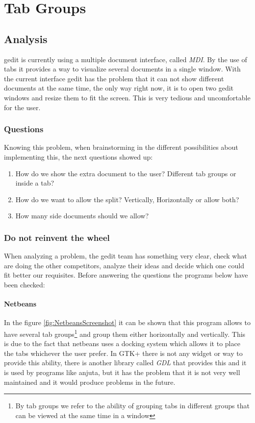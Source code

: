 
\chapter{Tab Groups}

\section{Analysis}

gedit is currently using a multiple document interface, called \emph{MDI}. By the use of tabs it provides a way to visualize several documents in a single window. With the current interface gedit has the problem that it can not show different documents at the same time, the only way right now, it is to open two gedit windows and resize them to fit the screen. This is very tedious and uncomfortable for the user.

\subsection{Questions}

Knowing this problem, when brainstorming in the different possibilities about implementing this, the next questions showed up:
\begin{enumerate}
  \item How do we show the extra document to the user? Different tab groups or inside a tab?
  \item How do we want to allow the split? Vertically, Horizontally or allow both?
  \item How many side documents should we allow?
\end{enumerate}

\subsection{Do not reinvent the wheel}

When analyzing a problem, the gedit team has something very clear, check what are doing the other competitors, analyze their ideas and decide which one could fit better our requisites. Before answering the questions the programs below have been checked:

\subsubsection{Netbeans}

In the figure \ref{fig:NetbeansScreenshot} it can be shown that this program allows to have several tab groups\footnote{By tab groups we refer to the ability of grouping tabs in different groups that can be viewed at the same time in a window} and group them either horizontally and vertically. This is due to the fact that netbeans uses a docking system which allows it to place the tabs whichever the user prefer. In GTK+ there is not any widget or way to provide this ability, there is another library called \emph{GDL} that provides this and it is used by programs like anjuta, but it has the problem that it is not very well maintained and it would produce problems in the future.

